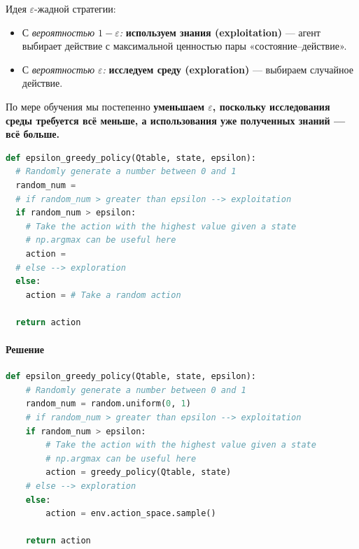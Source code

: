 \documentclass[11pt,a4paper]{article}
\begin{document}
Идея \(\varepsilon\)-жадной стратегии:

\begin{itemize}
\item
  С \emph{вероятностью \(1-\varepsilon\):} \textbf{используем знания (exploitation)} --- агент выбирает действие с максимальной ценностью пары «состояние--действие».
\item
  С \emph{вероятностью \(\varepsilon\):} \textbf{исследуем среду (exploration)} --- выбираем случайное действие.
\end{itemize}

По мере обучения мы постепенно \textbf{уменьшаем \(\varepsilon\), поскольку исследования среды требуется всё меньше, а использования уже полученных знаний --- всё больше.}


\begin{lstlisting}[language=Python]
def epsilon_greedy_policy(Qtable, state, epsilon):
  # Randomly generate a number between 0 and 1
  random_num =
  # if random_num > greater than epsilon --> exploitation
  if random_num > epsilon:
    # Take the action with the highest value given a state
    # np.argmax can be useful here
    action =
  # else --> exploration
  else:
    action = # Take a random action

  return action
\end{lstlisting}

\paragraph{Решение}\label{solution-3}

\begin{lstlisting}[language=Python]
def epsilon_greedy_policy(Qtable, state, epsilon):
    # Randomly generate a number between 0 and 1
    random_num = random.uniform(0, 1)
    # if random_num > greater than epsilon --> exploitation
    if random_num > epsilon:
        # Take the action with the highest value given a state
        # np.argmax can be useful here
        action = greedy_policy(Qtable, state)
    # else --> exploration
    else:
        action = env.action_space.sample()

    return action
\end{lstlisting}
\end{document}

